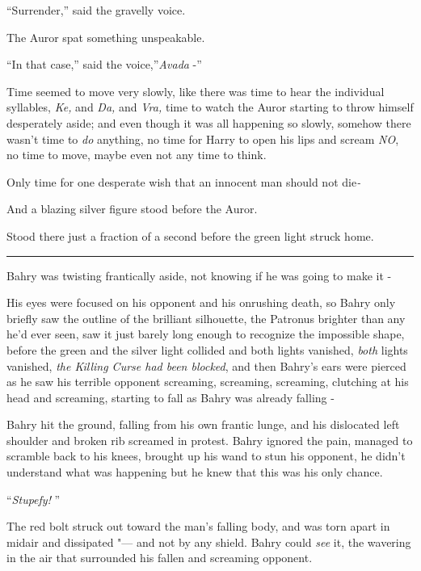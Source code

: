 ``Surrender,'' said the gravelly voice.

The Auror spat something unspeakable.

``In that case,'' said the voice,''\emph{Avada} -''

Time seemed to move very slowly, like there was time to hear the
individual syllables, \emph{Ke,} and \emph{Da,} and \emph{Vra,} time to
watch the Auror starting to throw himself desperately aside; and even
though it was all happening so slowly, somehow there wasn't time to
\emph{do} anything, no time for Harry to open his lips and scream
\emph{NO}, no time to move, maybe even not any time to think.

Only time for one desperate wish that an innocent man should not
die\emph{-}

And a blazing silver figure stood before the Auror.

Stood there just a fraction of a second before the green light struck
home.

\begin{center}\rule{3in}{0.4pt}\end{center}

Bahry was twisting frantically aside, not knowing if he was going to
make it -

His eyes were focused on his opponent and his onrushing death, so Bahry
only briefly saw the outline of the brilliant silhouette, the Patronus
brighter than any he'd ever seen, saw it just barely long enough to
recognize the impossible shape, before the green and the silver light
collided and both lights vanished, \emph{both} lights vanished,
\emph{the Killing Curse had been blocked}, and then Bahry's ears were
pierced as he saw his terrible opponent screaming, screaming, screaming,
clutching at his head and screaming, starting to fall as Bahry was
already falling -

Bahry hit the ground, falling from his own frantic lunge, and his
dislocated left shoulder and broken rib screamed in protest. Bahry
ignored the pain, managed to scramble back to his knees, brought up his
wand to stun his opponent, he didn't understand what was happening but
he knew that this was his only chance.

``\emph{Stupefy!} ''

The red bolt struck out toward the man's falling body, and was torn
apart in midair and dissipated "--- and not by any shield. Bahry could
\emph{see} it, the wavering in the air that surrounded his fallen and
screaming opponent.

